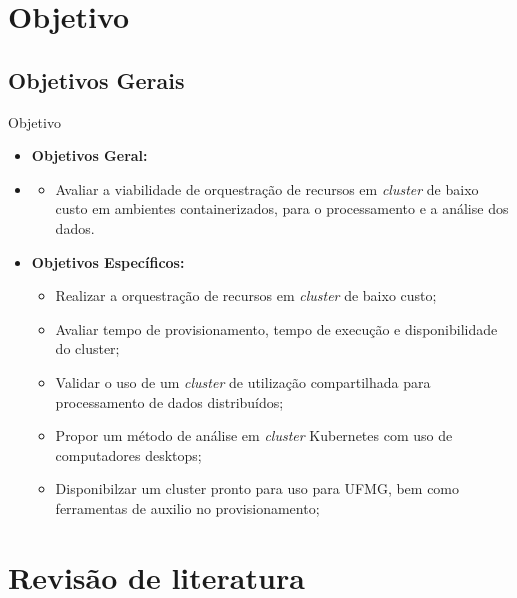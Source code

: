 \documentclass[10pt,brazil]{beamer}
\theoremstyle{definition}
\begin{document}
\section{Objetivo}
\subsection*{Objetivos Gerais}
\begin{frame}{Objetivo}
  \begin{itemize}
    \item[] \textbf{Objetivos Geral:}
    \item[]
      \begin{itemize}
        \item[] Avaliar a viabilidade de orquestração de recursos em \emph{cluster} de baixo custo em ambientes containerizados, para o processamento e a análise dos dados.
      \end{itemize}
    \item[] \textbf{Objetivos Específicos:}
      \begin{itemize}
        \item Realizar a orquestração de recursos em \emph{cluster} de baixo custo;
        \item Avaliar tempo de provisionamento, tempo de execução e disponibilidade do cluster;
        \item Validar o uso de um \emph{cluster} de utilização compartilhada para processamento de dados distribuídos;
        \item Propor um método de análise em \emph{cluster} Kubernetes com uso de computadores desktops;
        \item Disponibilzar um cluster pronto para uso para UFMG, bem como ferramentas de auxilio no provisionamento;
      \end{itemize}
  \end{itemize}
\end{frame}


\section{Revisão de literatura}

\end{document}
